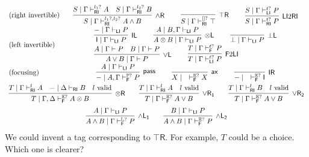 \documentclass[submission,copyright,creativecommons]{eptcs}
\theoremstyle{definition}
\newcommand{\tl}{\otimes \mathsf{L}}
\newcommand{\tr}{\otimes \mathsf{R}}
\newcommand{\pass}{\mathsf{pass}}
\newcommand{\unitl}{\mathsf{IL}}
\newcommand{\unitr}{\mathsf{IR}}
\newcommand{\andlone}{\land \mathsf{L_{1}}}
\newcommand{\andltwo}{\land \mathsf{L_{2}}}
\newcommand{\andr}{\land \mathsf{R}}
\newcommand{\orl}{\lor \mathsf{L}}
\newcommand{\orrone}{\lor \mathsf{R_{1}}}
\newcommand{\orrtwo}{\lor \mathsf{R_{2}}}
\newcommand{\ax}{\mathsf{ax}}
\newcommand{\ot}{\otimes}
\newcommand{\I}{\mathsf{I}}
\newcommand{\RI}{\mathsf{RI}}
\newcommand{\LI}{\mathsf{LI}}
\newcommand{\F}{\mathsf{F}}
\newcommand{\tP}{\mathbb{P}}
\newcommand{\tL}{\mathbb{L}}
\newcommand{\tR}{\mathbb{R}}
\newcommand{\tE}{\mathbb{E}}
\newcommand{\topr}{\top \mathsf{R}}
\newcommand{\botl}{\bot \mathsf{L}}
\newcommand{\proofbox}[1]{\begin{tabular}{l} #1 \end{tabular}}
\newcommand\cheng[1]{\mbox{}
{\marginpar{\color{blue}CSW}}
{\sf\noindent\color{blue}#1}}%
\begin{document}
\begin{equation}\label{eq:focus:units}
  \begin{array}{lc}
    \text{(right invertible)} & %
    \proofbox{
      \infer[\andr]{S \mid \Gamma \vdash^{l_1?, l_2?}_{\RI} A \land B}{
        S \mid \Gamma \vdash^{l_1?}_{\RI} A
        &
        S \mid \Gamma \vdash^{l_2?}_{\RI} B
      }
    \qquad
    \infer[\topr]{S \mid \Gamma \vdash^{[]?}_{\RI} \top}{}
    \qquad
    \infer[\LI 2 \RI]{S \mid \Gamma \vdash^{t?}_{\RI} P}{S \mid \Gamma \vdash^{t?}_{\LI} P}
    }
    \\[10pt]
    \text{(left invertible)} & %
    \proofbox{
      \infer[\unitl]{\I \mid \Gamma \vdash_{\LI} P}{{-} \mid \Gamma \vdash_{\LI} P}
    \qquad
    \infer[\tl]{A \ot B \mid \Gamma \vdash_{\LI} P}{A \mid B , \Gamma \vdash_{\LI} P}
    \qquad
    \infer[\botl]{\bot \mid \Gamma \vdash_{\LI} P}{}
    \\
    \infer[\orl]{A \lor B \mid \Gamma \vdash P}{
      A \mid \Gamma \vdash P
      &
      B \mid \Gamma \vdash P
    }
    \qquad
    \infer[\F 2 \LI]{T \mid \Gamma \vdash^{t?}_{\LI} P}{T \mid \Gamma \vdash^{t?}_{\F} P}
    }
    \\[10pt]
    \text{(focusing)} &    %
    \proofbox{
    \infer[\pass]{{-} \mid A , \Gamma \vdash^{\tP?}_{\F} P }{
        A \mid \Gamma \vdash_{\LI} P
    }
    \qquad
    \infer[\ax]{X \mid \quad \vdash^{\tE?}_{\F} X}{}
    \qquad
    \infer[\unitr]{{-} \mid \quad \vdash^{\tE?}_{\F} \I}{}
    }
    \\[10pt]
    \multicolumn{2}{c}{
    \infer[\tr]{T \mid \Gamma , \Delta \vdash^{\tE?}_{\F} A \ot B}{
      T \mid \Gamma \vdash^{l}_{\RI} A
      &
      {-} \mid \Delta \vdash_{\RI} B
      &
      l \ \text{valid}
    }
    \qquad
    \infer[\orrone]{T \mid \Gamma \vdash^{\tE?}_{\F} A \lor B}{
      T \mid \Gamma \vdash^{l}_{\RI} A
      &
      l \ \text{valid}
    }
    \qquad
    \infer[\orrtwo]{T \mid \Gamma \vdash^{\tE?}_{\F} A \lor B}{
      T \mid \Gamma \vdash^{l}_{\RI} B
      &
      l \ \text{valid}
    }
    }
    \\[6pt]
    \multicolumn{2}{c}{
    \infer[\andlone]{A \land B \mid \Gamma \vdash^{\tL?}_{\F} P}{A \mid \Gamma \vdash_{\LI} P}
    \qquad
    \infer[\andltwo]{A \land B \mid \Gamma \vdash^{\tR?}_{\F} P}{B \mid \Gamma \vdash_{\LI} P}
    }
  \end{array}
\end{equation}
\cheng{We could invent a tag corresponding to $\topr$. For example, $T$ could be a choice. Which one is clearer?} 
\end{document}
